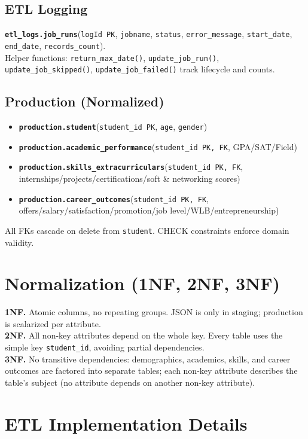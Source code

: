 \documentclass[11pt]{article}
\begin{document}
\subsection*{ETL Logging}
\textbf{\texttt{etl\_logs.job\_runs}}(\texttt{logId PK}, \texttt{jobname}, \texttt{status}, \texttt{error\_message}, \texttt{start\_date}, \texttt{end\_date}, \texttt{records\_count}).\\
Helper functions: \texttt{return\_max\_date()}, \texttt{update\_job\_run()}, \texttt{update\_job\_skipped()}, \texttt{update\_job\_failed()} track lifecycle and counts.

\subsection*{Production (Normalized)}
\begin{itemize}[leftmargin=1.2em]
  \item \textbf{\texttt{production.student}}(\texttt{student\_id PK}, \texttt{age}, \texttt{gender})
  \item \textbf{\texttt{production.academic\_performance}}(\texttt{student\_id PK, FK}, GPA/SAT/Field)
  \item \textbf{\texttt{production.skills\_extracurriculars}}(\texttt{student\_id PK, FK}, internships/projects/certifications/soft \& networking scores)
  \item \textbf{\texttt{production.career\_outcomes}}(\texttt{student\_id PK, FK}, offers/salary/satisfaction/promotion/job level/WLB/entrepreneurship)
\end{itemize}
All FKs cascade on delete from \texttt{student}. CHECK constraints enforce domain validity.

\section{Normalization (1NF, 2NF, 3NF)}
\textbf{1NF.} Atomic columns, no repeating groups. JSON is only in staging; production is scalarized per attribute.\\
\textbf{2NF.} All non-key attributes depend on the whole key. Every table uses the simple key \texttt{student\_id}, avoiding partial dependencies.\\
\textbf{3NF.} No transitive dependencies: demographics, academics, skills, and career outcomes are factored into separate tables; each non-key attribute describes the table's subject (no attribute depends on another non-key attribute).

\section{ETL Implementation Details}
\end{document}
